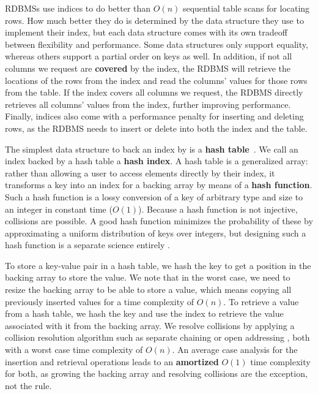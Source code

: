 RDBMSs use indices to do better than \(O(n)\) sequential table scans for locating rows.
How much better they do is determined by the data structure they use to implement their index, but each data structure comes with its own tradeoff between flexibility and performance.
Some data structures only support equality, whereas others support a partial order on keys as well.
In addition, if not all columns we request are \textbf{covered} by the index, the RDBMS will retrieve the locations of the rows from the index and read the columns' values for those rows from the table.
If the index covers all columns we request, the RDBMS directly retrieves all columns' values from the index, further improving performance.
Finally, indices also come with a performance penalty for inserting and deleting rows, as the RDBMS needs to insert or delete into both the index and the table.

The simplest data structure to back an index by is a \textbf{hash table}~\cite{DBLP:books/daglib/0023376}.
We call an index backed by a hash table a \textbf{hash index}.
A hash table is a generalized array\thinspace: rather than allowing a user to access elements directly by their index, it transforms a key into an index for a backing array by means of a \textbf{hash function}.
Such a hash function is a lossy conversion of a key of arbitrary type and size to an integer in constant time (\(O(1)\)).
Because a hash function is not injective, collisions are possible.
A good hash function minimizes the probability of these by approximating a uniform distribution of keys over integers, but designing such a hash function is a separate science entirely \cite{DBLP:books/daglib/0023376}.

To store a key-value pair in a hash table, we hash the key to get a position in the backing array to store the value.
We note that in the worst case, we need to resize the backing array to be able to store a value, which means copying all previously inserted values for a time complexity of \(O(n)\).
To retrieve a value from a hash table, we hash the key and use the index to retrieve the value associated with it from the backing array.
We resolve collisions by applying a collision resolution algorithm such as separate chaining or open addressing \cite{DBLP:books/daglib/0023376}, both with a worst case time complexity of \(O(n)\).
An average case analysis for the insertion and retrieval operations leads to an \textbf{amortized} \(O(1)\) time complexity for both, as growing the backing array and resolving collisions are the exception, not the rule.

